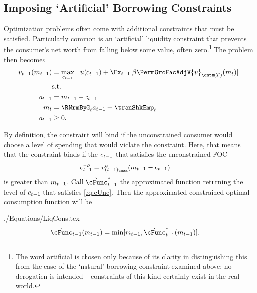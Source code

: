 \documentclass[SolvingMicroDSOPs]{subfiles}
\begin{document}
\subsection{Imposing `Artificial' Borrowing Constraints}

Optimization problems often come with additional constraints that must
be satisfied.  Particularly common is an `artificial' liquidity constraint that
prevents the consumer's net worth from falling below some value, often
zero.\footnote{The word artificial is chosen only because of its clarity in distinguishing
  this from the case of the `natural' borrowing constraint examined above; no derogation is
  intended -- constraints of this kind certainly exist in the real world.}  The problem then becomes
\begin{equation*}\begin{gathered}\begin{aligned}
      \vFunc_{\prd-1}(m_{\prd-1})  & = \max_{\cNrm_{\prd-1}} ~~ \uFunc(c_{\prd-1}) + \Ex_{\prd-1} [\DiscFac \PermGroFacAdjV{\vFunc}_{\cntn(T)}(m_{\prd})] \label{eq:ConstrArt}
      \\ & \mbox{s.t.}  \nonumber
      \\ a_{\prd-1}  & = m_{\prd-1} - c_{\prd-1}
      \\ m_{\prd}  & = \RNrmByG_{\prd} a_{\prd-1} + \tranShkEmp_{\prd}
      \\ a_{\prd-1} & \geq 0 .
    \end{aligned}\end{gathered}\end{equation*}


By definition, the constraint will bind if the unconstrained consumer
would choose a level of spending that would violate the constraint.
Here, that means that the constraint binds if the $c_{t-1}$
that satisfies the unconstrained FOC
\begin{equation}\begin{gathered}\begin{aligned}
      c_{\prd-1}^{-\CRRA}  & = \vFunc^{a}_{({\prd-1})_\cntn}(m_{\prd-1}-c_{\prd-1}) \label{eq:cUnc}
    \end{aligned}\end{gathered}\end{equation}
is greater than $m_{t-1}$.  Call $\grave{\cFunc}^{\ast}_{\prd-1}$ the approximated function
returning the level of $c_{t-1}$ that satisfies \eqref{eq:cUnc}.
Then the approximated constrained optimal consumption function will be
\begin{verbatimwrite}{./Equations/LiqCons.tex}
  \begin{equation}\begin{gathered}\begin{aligned}
        \grave{\cFunc}_{\prd-1}(m_{\prd-1})  & = \min[{m}_{\prd-1},\grave{\cFunc}^{\ast}_{\prd-1}(m_{\prd-1})] \label{eq:LiqCons}.
      \end{aligned}\end{gathered}\end{equation}
\end{verbatimwrite}
\unskip
\end{document}
